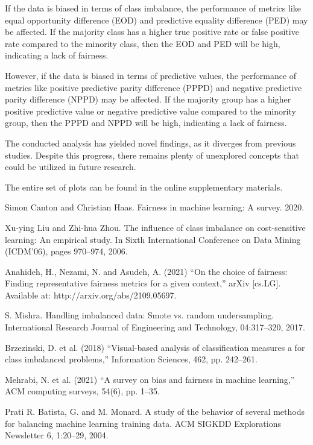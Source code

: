 \documentclass[sn-vancouver]{sn-jnl}%
\theoremstyle{thmstyleone}%
\theoremstyle{thmstyletwo}%
\theoremstyle{thmstylethree}%
\begin{document}
If the data is biased in terms of class imbalance, the performance of metrics like equal opportunity difference (EOD) and predictive equality difference (PED) may be affected. If the majority class has a higher true positive rate or false positive rate compared to the minority class, then the EOD and PED will be high, indicating a lack of fairness.

However, if the data is biased in terms of predictive values, the performance of metrics like positive predictive parity difference (PPPD) and negative predictive parity difference (NPPD) may be affected. If the majority group has a higher positive predictive value or negative predictive value compared to the minority group, then the PPPD and NPPD will be high, indicating a lack of fairness.

The conducted analysis has yielded novel findings, as it diverges from previous studies. Despite this progress, there remains plenty of unexplored concepts that could be utilized in future research.

\backmatter


The entire set of plots can be found in the online supplementary materials.

\begin{thebibliography}{9}

 Simon Canton and Christian Haas. Fairness in machine learning: A survey. 2020.

 Xu-ying Liu and Zhi-hua Zhou. The influence of class imbalance on cost-sensitive learning: An empirical study. In Sixth International Conference on Data Mining (ICDM’06), pages 970–974, 2006.

 Anahideh, H., Nezami, N. and Asudeh, A. (2021) “On the choice of fairness: Finding representative fairness metrics for a given context,” arXiv [cs.LG]. Available at: http://arxiv.org/abs/2109.05697.

 S. Mishra. Handling imbalanced data: Smote vs. random undersampling. International Research Journal of Engineering and Technology, 04:317–320, 2017.

 Brzezinski, D. et al. (2018) “Visual-based analysis of classification measures a for class imbalanced problems,” Information Sciences, 462, pp. 242–261.

 Mehrabi, N. et al. (2021) “A survey on bias and fairness in machine learning,” ACM computing surveys, 54(6), pp. 1–35.

 Prati R. Batista, G. and M. Monard. A study of the behavior of several methods for balancing machine learning training data. ACM SIGKDD Explorations Newsletter 6, 1:20–29, 2004.

\end{thebibliography}


\end{document}

